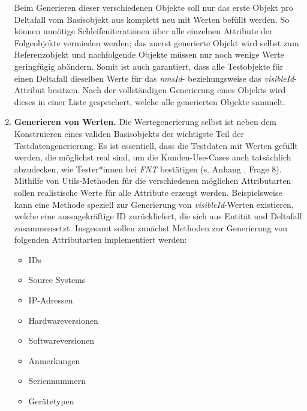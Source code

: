 \begin{enumerate}
    Beim Generieren dieser verschiedenen Objekte soll nur das erste Objekt pro Deltafall vom Basisobjekt aus komplett neu mit Werten befüllt werden. So können unnötige Schleifeniterationen über alle einzelnen Attribute der Folgeobjekte vermieden werden; das zuerst generierte Objekt wird selbst zum Referenzobjekt und nachfolgende Objekte müssen nur noch wenige Werte geringfügig abändern. Somit ist auch garantiert, dass alle Testobjekte für einen Deltafall dieselben Werte für das \textit{nmsId}- beziehungsweise das \textit{visibleId}-Attribut besitzen. Nach der vollständigen Generierung eines Objekts wird dieses in einer Liste gespeichert, welche alle generierten Objekte sammelt.
    \item \textbf{Generieren von Werten.} Die Wertegenerierung selbst ist neben dem Konstruieren eines validen Basisobjekts der wichtigste Teil der Testdatengenerierung. Es ist essentiell, dass die Testdaten mit Werten gefüllt werden, die möglichst real sind, um die Kunden-Use-Cases auch tatsächlich abzudecken, wie Tester*innen bei \textit{FNT} bestätigen (s. Anhang , Frage 8). Mithilfe von Utils-Methoden für die verschiedenen möglichen Attributarten sollen realistische Werte für alle Attribute erzeugt werden. Beispielsweise kann eine Methode speziell zur Generierung von \textit{visibleId}-Werten existieren, welche eine aussagekräftige ID zurückliefert, die sich aus Entität und Deltafall zusammensetzt. Insgesamt sollen zunächst Methoden zur Generierung von folgenden Attributarten implementiert werden:
    \newpage
    \begin{itemize}
        \item IDs
        \item Source Systems
        \item IP-Adressen
        \item Hardwareversionen
        \item Softwareversionen
        \item Anmerkungen
        \item Seriennummern
        \item Gerätetypen
    \end{itemize}


\end{enumerate}
